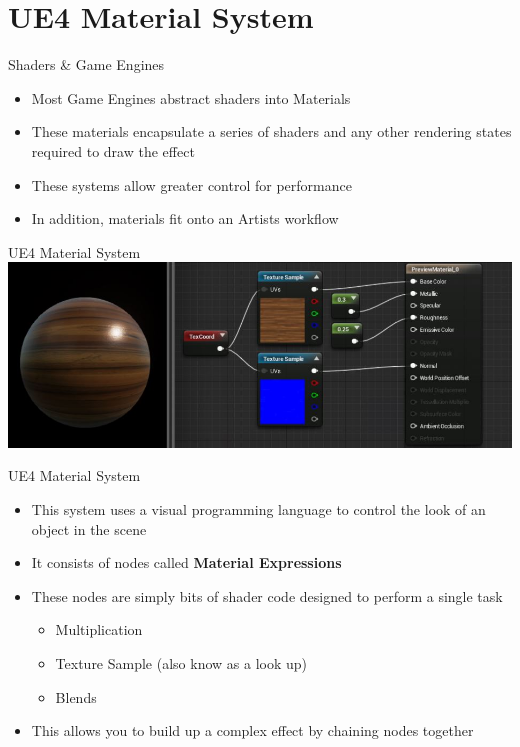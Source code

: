 \part{UE4 Material System}
\frame{\partpage}

\begin{frame}{Shaders \& Game Engines}
\begin{itemize}
	\item Most Game Engines abstract shaders into Materials
	\pause\item These materials encapsulate a series of shaders and any other rendering states required to draw the effect
	\pause \item These systems allow greater control for performance
	\pause \item In addition, materials fit onto an Artists workflow
\end{itemize}
\end{frame}

\begin{frame}{UE4 Material System}
		\includegraphics[height=0.8\textheight, width=1.0\textwidth]{UE4_material}
\end{frame}

\begin{frame}{UE4 Material System}
\begin{itemize}
	\item This system uses a visual programming language to control the look of an object in the scene
	\pause \item It consists of nodes called \textbf{Material Expressions}
	\pause \item These nodes are simply bits of shader code designed to perform a single task
	\begin{itemize}
		\item Multiplication
		\item Texture Sample (also know as a look up)
		\item Blends
	\end{itemize}
	\pause \item This allows you to build up a complex effect by chaining nodes together
\end{itemize}
\end{frame}


